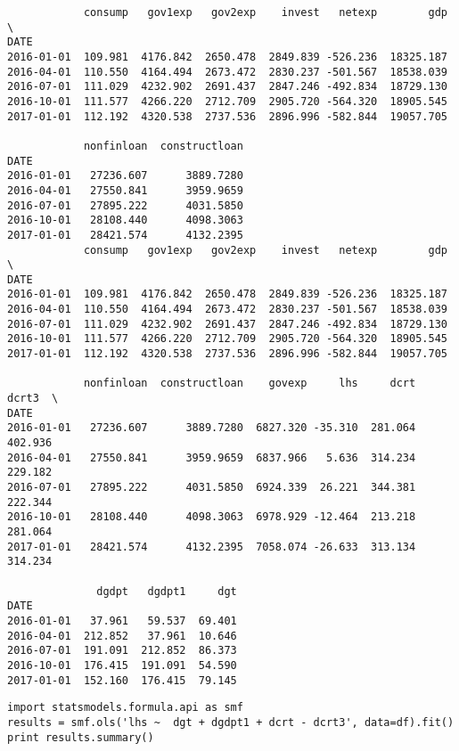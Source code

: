 \documentclass[12pt,fleqn]{article}\usepackage{../../common}
\begin{document}
\begin{verbatim}
            consump   gov1exp   gov2exp    invest   netexp        gdp  \
DATE                                                                    
2016-01-01  109.981  4176.842  2650.478  2849.839 -526.236  18325.187   
2016-04-01  110.550  4164.494  2673.472  2830.237 -501.567  18538.039   
2016-07-01  111.029  4232.902  2691.437  2847.246 -492.834  18729.130   
2016-10-01  111.577  4266.220  2712.709  2905.720 -564.320  18905.545   
2017-01-01  112.192  4320.538  2737.536  2896.996 -582.844  19057.705   

            nonfinloan  constructloan  
DATE                                   
2016-01-01   27236.607      3889.7280  
2016-04-01   27550.841      3959.9659  
2016-07-01   27895.222      4031.5850  
2016-10-01   28108.440      4098.3063  
2017-01-01   28421.574      4132.2395  
            consump   gov1exp   gov2exp    invest   netexp        gdp  \
DATE                                                                    
2016-01-01  109.981  4176.842  2650.478  2849.839 -526.236  18325.187   
2016-04-01  110.550  4164.494  2673.472  2830.237 -501.567  18538.039   
2016-07-01  111.029  4232.902  2691.437  2847.246 -492.834  18729.130   
2016-10-01  111.577  4266.220  2712.709  2905.720 -564.320  18905.545   
2017-01-01  112.192  4320.538  2737.536  2896.996 -582.844  19057.705   

            nonfinloan  constructloan    govexp     lhs     dcrt    dcrt3  \
DATE                                                                        
2016-01-01   27236.607      3889.7280  6827.320 -35.310  281.064  402.936   
2016-04-01   27550.841      3959.9659  6837.966   5.636  314.234  229.182   
2016-07-01   27895.222      4031.5850  6924.339  26.221  344.381  222.344   
2016-10-01   28108.440      4098.3063  6978.929 -12.464  213.218  281.064   
2017-01-01   28421.574      4132.2395  7058.074 -26.633  313.134  314.234   

              dgdpt   dgdpt1     dgt  
DATE                                  
2016-01-01   37.961   59.537  69.401  
2016-04-01  212.852   37.961  10.646  
2016-07-01  191.091  212.852  86.373  
2016-10-01  176.415  191.091  54.590  
2017-01-01  152.160  176.415  79.145  
\end{verbatim}

\begin{verbatim}
import statsmodels.formula.api as smf
results = smf.ols('lhs ~  dgt + dgdpt1 + dcrt - dcrt3', data=df).fit()
print results.summary()
\end{verbatim}
\end{document}
